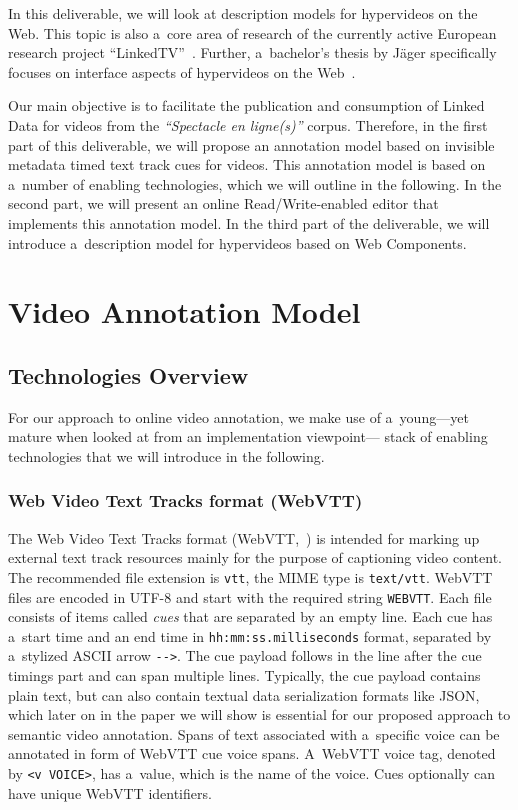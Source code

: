 \documentclass[runningheads,a4paper]{llncs}
\begin{document}
In this deliverable, we will look at
description models for hypervideos on the Web.
This topic is also a~core area of research of the currently active
European research project ``LinkedTV''~\cite{linkedtv2012hypervideo}.
Further, a~bachelor's thesis by Jäger specifically focuses on interface aspects
of hypervideos on the Web~\cite{jaeger2012hypervideo}.

Our main objective is to facilitate the publication and consumption
of Linked Data for videos from the \emph{``Spectacle en ligne(s)''} corpus.
Therefore, in the first part of this deliverable,
we will propose an annotation model
based on invisible metadata timed text track cues for videos.
This annotation model is based on a~number of enabling technologies,
which we will outline in the following.
In the second part, we will present an online Read/Write-enabled editor
that implements this annotation model.
In the third part of the deliverable,
we will introduce a~description model for hypervideos
based on Web Components.

\section{Video Annotation Model}

\subsection{Technologies Overview}

For our approach to online video annotation,
we make use of a~young---yet mature
when looked at from an implementation viewpoint---%
stack of enabling technologies that we will introduce in the following.

\subsubsection{Web Video Text Tracks format (WebVTT)}

The Web Video Text Tracks format (WebVTT,~\cite{pfeiffer2013webvtt})
is intended for marking up external text track resources mainly
for the purpose of captioning video content.
The recommended file extension is \texttt{vtt},
the MIME type is \texttt{text/vtt}.
WebVTT files are encoded in UTF-8 and
start with the required string \texttt{WEBVTT}.
Each file consists of items called \emph{cues}
that are separated by an empty line.
Each cue has a~start time and an end time in
\texttt{hh:mm:ss.milliseconds} format,
separated by a~stylized ASCII arrow \texttt{-}\texttt{->}.
The cue payload follows in the line after the cue timings part
and can span multiple lines.
Typically, the cue payload contains plain text,
but can also contain textual data serialization formats like JSON,
which later on in the paper we will show is essential
for our proposed approach to semantic video annotation.
Spans of text associated with a~specific voice can be annotated
in form of WebVTT cue voice spans.
A~WebVTT voice tag, denoted by \texttt{<v VOICE>}, has a~value,
which is the name of the voice.
Cues optionally can have unique WebVTT identifiers.
\end{document}
